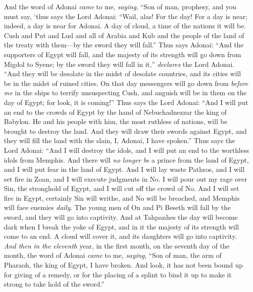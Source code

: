 \begin{biblechapter} %
 And the word of Adonai \textit{came} to me, \textit{saying},
\verse “Son of man, prophesy, and you must say, ‘thus says the Lord Adonai:
\verse “Wail, alas! For the day!
\verse For a day is near; 
indeed, a day is near for Adonai. 
A day of cloud, 
a time of the nations it will be.
\verse Cush and Put and Lud and all of Arabia and Kub and the people of the land of the treaty with them—by the sword they will fall.”
\verse Thus says Adonai:
\verse “And the supporters of Egypt will fall, 
and the majesty of its strength will go down 
from Migdol to Syene; 
by the sword they will fall in it,” 
\textit{declares} the Lord Adonai.
\verse “And they will be desolate in the midst of desolate countries, 
and its cities will be in the midst of ruined cities.
\verse On that day messengers will go down from \textit{before me} in the ships to terrify unsuspecting Cush, and anguish will be in them on the day of Egypt; for look, it is coming!”
\verse Thus says the Lord Adonai:
\verse “And I will put an end to the crowds of Egypt 
by the hand of Nebuchadnezzar the king of Babylon.
\verse He and his people with him, the most ruthless of nations, 
will be brought to destroy the land. 
And they will draw their swords against Egypt, 
and they will fill the land with the slain, I, Adonai, I have spoken.”
\verse Thus says the Lord Adonai:
\verse “And I will destroy the idols, 
and I will put an end to the worthless idols from Memphis. 
And there will \textit{no longer be} a prince from the land of Egypt, 
and I will put fear in the land of Egypt.
\verse And I will lay waste Pathros, 
and I will set fire in Zoan, 
and I will execute judgments in No.
\verse I will pour out my rage over Sin, 
the stronghold of Egypt, 
and I will cut off the crowd of No.
\verse And I will set fire in Egypt, 
certainly Sin will writhe, 
and No will be breached, 
and Memphis will face enemies \textit{daily}.
\verse The young men of On and Pi Beseth will fall by the sword, 
and they will go into captivity.
\verse And at Tahpanhes the day will become dark 
when I break the yoke of Egypt, 
and in it the majesty of its strength 
will come to an end. 
A cloud will cover it, 
and its daughters will go into captivity.
\verse \textit{And then} \textit{in the eleventh} year, in the first month, on the seventh day of the month, the word of Adonai \textit{came} to me, \textit{saying},
\verse “Son of man, the arm of Pharaoh, the king of Egypt, I have broken. And look, it has not been bound up for giving of a remedy, or for the placing of a splint to bind it up to make it strong to take hold of the sword.”

\end{biblechapter}
